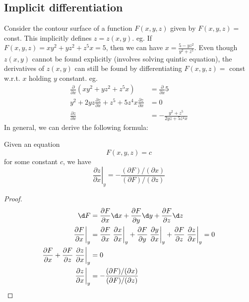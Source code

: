 \documentclass[a4paper]{article}
\begin{document}
  \subsection{Implicit differentiation}
  Consider the contour surface of a function $F(x, y, z)$ given by $F(x, y, z) = $ const. This implicitly defines $z = z(x, y)$. eg. If $F(x, y, z) = xy^2 + yz^2 + z^5x = 5$, then we can have $x = \frac{5 - yz^2}{y^2 + z^5}$. Even though $z(x, y)$ cannot be found explicitly (involves solving quintic equation), the derivatives of $z(x, y)$ can still be found by differentiating $F(x, y, z) =$ const w.r.t. $x$ holding $y$ constant. eg.
  \begin{align*}
    \frac{\partial }{\partial x}(xy^2 + yz^2 + z^5x) &= \frac{\partial }{\partial x}5\\
    y^2 + 2yz\frac{\partial z}{\partial x} + z^5 + 5z^4x\frac{\partial z}{\partial x} &= 0\\
    \frac{\partial z}{\partial x} &= -\frac{y^2 + z^5}{2yz + 5z^4x}
  \end{align*}
  In general, we can derive the following formula:
  \begin{thm} Given an equation 
    \[
      F(x, y, z) = c
    \]
    for some constant $c$, we have
    \[
      \left.\frac{\partial z}{\partial x}\right|_y = -\frac{(\partial F)/(\partial x)}{(\partial F)/(\partial z)}
    \]
  \end{thm}

  \begin{proof}
    \begin{align*}
      \d F &= \frac{\partial F}{\partial x}\d x + \frac{\partial F}{\partial y}\d y + \frac{\partial F}{\partial z}\d z\\
      \left.\frac{\partial F}{\partial x}\right|_y &= \frac{\partial F}{\partial x}\left.\frac{\partial x}{\partial x}\right|_y + \frac{\partial F}{\partial y}\left.\frac{\partial y}{\partial x}\right|_y + \frac{\partial F}{\partial z}\left.\frac{\partial z}{\partial x}\right|_y = 0\\
      \frac{\partial F}{\partial x} + \frac{\partial F}{\partial z}\left.\frac{\partial z}{\partial x}\right|_y &= 0\\
      \left.\frac{\partial z}{\partial x}\right|_y &= -\frac{(\partial F)/(\partial x)}{(\partial F)/(\partial z)}
    \end{align*}
  \end{proof}
\end{document}
